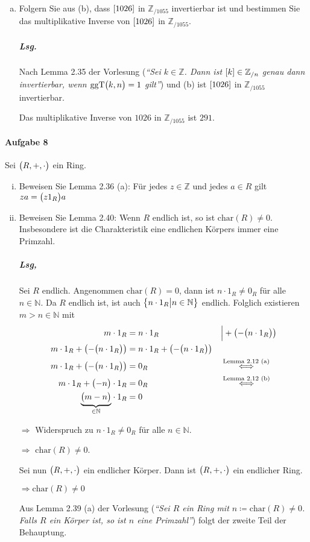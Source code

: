 \documentclass{scrreprt}
\newcommand\Char{\text{char}}
\newcommand\ggT{\text{ggT}}
\begin{document}
\begin{enumerate}[(a)]
\item Folgern Sie aus (b), dass $\qty[1026]$ in $\mathbb{Z}_{/ 1055}$
  invertierbar ist und bestimmen Sie das multiplikative Inverse von
  $\qty[1026]$ in $\mathbb{Z}_{/ 1055}$.

  \subparagraph{Lsg.} Nach Lemma 2.35 der Vorlesung (\emph{``Sei
    $k \in \mathbb{Z}$. Dann ist $\qty[k] \in \mathbb{Z}_{/ n}$
    genau dann invertierbar, wenn $\ggT\qty\big(k, n) = 1$ gilt''}) und
  (b) ist $\qty[1026]$ in $\mathbb{Z}_{/ 1055}$ invertierbar.

  Das multiplikative Inverse von $1026$ in $\mathbb{Z}_{/ 1055}$ ist $291$.
\end{enumerate}

\paragraph{Aufgabe 8} Sei $\qty\big(R, +, \cdot)$ ein Ring.
\begin{enumerate}[(i)]
\item Beweisen Sie Lemma 2.36 (a): Für jedes $z \in \mathbb{Z}$ und jedes
  $a \in R$ gilt $za = \qty\big(z1_R)a$

\newpage
\item Beweisen Sie Lemma 2.40: Wenn $R$ endlich ist, so ist $\Char(R) \ne 0$.
  Insbesondere ist die Charakteristik eine endlichen Körpers immer eine
  Primzahl.

  \subparagraph{Lsg,} Sei $R$ endlich.
  Angenommen $\Char(R) = 0$, dann ist $n \cdot 1_R \ne 0_R$ für alle
  $n \in \mathbb{N}$.
  Da $R$ endlich ist, ist auch $\qty\big{n \cdot 1_R {\big |} n \in \mathbb{N}}$
  endlich.
  Folglich existieren $m > n \in \mathbb{N}$ mit
  \begin{align*}
    m \cdot 1_R &= n \cdot 1_R && {\Big |} + \qty(-\qty\big(n \cdot 1_R)) \\
    m \cdot 1_R + \qty(-\qty\big(n \cdot 1_R)) &= n \cdot 1_R + \qty(-\qty\big(n \cdot 1_R)) \\
    m \cdot 1_R + \qty(-\qty\big(n \cdot 1_R)) &= 0_R && \overset{\text{Lemma 2.12 (a)}}\iff \\
    m \cdot 1_R + \qty\big(- n) \cdot 1_R &= 0_R && \overset{\text{Lemma 2.12 (b)}}\iff \\
    \underset{\in \mathbb{N}}{\underbrace{\qty\big(m - n)}} \cdot 1_R &= 0
  \end{align*}

  $\Rightarrow$ Widerspruch zu $n \cdot 1_R \ne 0_R$ für alle $n \in \mathbb{N}$.

  $\Rightarrow$ \underline{$\Char(R) \ne 0$}.

  Sei nun $\qty\big(R, +, \cdot)$ ein endlicher Körper.
  Dann ist $\qty\big(R, +, \cdot)$ ein endlicher Ring.

  $\Rightarrow \Char(R) \ne 0$

  Aus Lemma 2.39 (a) der Vorlesung (\emph{``Sei $R$ ein Ring mit
    $n \coloneqq \Char(R) \ne 0$. Falls $R$ ein Körper ist, so ist $n$ eine
    Primzahl''}) folgt der zweite Teil der Behauptung.
\end{enumerate}
\end{document}

